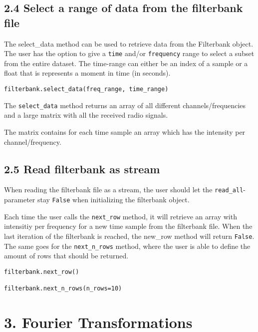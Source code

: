\documentclass[]{article}
\begin{document}
\subsection{2.4 Select a range of data from the filterbank
file}\label{select-a-range-of-data-from-the-filterbank-file}

The select\_data method can be used to retrieve data from the Filterbank
object. The user has the option to give a \texttt{time} and/or
\texttt{frequency} range to select a subset from the entire dataset. The
time-range can either be an index of a sample or a float that is
represents a moment in time (in seconds).

\begin{verbatim}
filterbank.select_data(freq_range, time_range)
\end{verbatim}

The \texttt{select\_data} method returns an array of all different
channels/frequencies and a large matrix with all the received radio
signals.

The matrix contains for each time sample an array which has the
intensity per channel/frequency.

\subsection{2.5 Read filterbank as
stream}\label{read-filterbank-as-stream}

When reading the filterbank file as a stream, the user should let the
\texttt{read\_all}-parameter stay \texttt{False} when initializing the
filterbank object.

Each time the user calls the \texttt{next\_row} method, it will retrieve
an array with intensitiy per frequency for a new time sample from the
filterbank file. When the last iteration of the filterbank is reached,
the new\_row method will return \texttt{False}.\\
The same goes for the \texttt{next\_n\_rows} method, where the user is
able to define the amount of rows that should be returned.

\begin{verbatim}
filterbank.next_row()

filterbank.next_n_rows(n_rows=10)
\end{verbatim}

\section{3. Fourier Transformations}\label{fourier-transformations}
\end{document}
